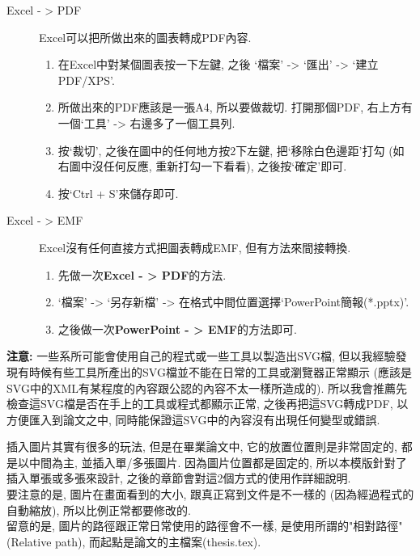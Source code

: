 \begin{description}
  \item[Excel - > PDF] Excel可以把所做出來的圖表轉成PDF內容. 
    \begin{enumerate}
      \item 在Excel中對某個圖表按一下左鍵, 之後 `檔案' -> `匯出' -> `建立PDF/XPS'.
      \item 所做出來的PDF應該是一張A4, 所以要做裁切. 打開那個PDF, 右上方有一個`工具' -> 右邊多了一個工具列.
      \item 按`裁切', 之後在圖中的任何地方按2下左鍵, 把`移除白色邊距'打勾 (如右圖中沒任何反應, 重新打勾一下看看), 之後按`確定'即可.
      \item 按`Ctrl + S'來儲存即可.
    \end{enumerate}

  \item[Excel - > EMF] Excel沒有任何直接方式把圖表轉成EMF, 但有方法來間接轉換.
    \begin{enumerate}
      \item 先做一次\textbf{Excel - > PDF}的方法.
      \item `檔案' -> `另存新檔' -> 在格式中間位置選擇`PowerPoint簡報(*.pptx)'.
      \item 之後做一次\textbf{PowerPoint - > EMF}的方法即可.
    \end{enumerate}
\end{description}

\noindent \textbf{注意:} 一些系所可能會使用自己的程式或一些工具以製造出SVG檔, 但以我經驗發現有時候有些工具所產出的SVG檔並不能在日常的工具或瀏覽器正常顯示 (應該是SVG中的XML有某程度的內容跟公認的內容不太一樣所造成的). 所以我會推薦先檢查這SVG檔是否在手上的工具或程式都顯示正常, 之後再把這SVG轉成PDF, 以方便匯入到論文之中, 同時能保證這SVG中的內容沒有出現任何變型或錯誤.

\newpage
{}

插入圖片其實有很多的玩法, 但是在畢業論文中, 它的放置位置則是非常固定的, 都是以中間為主, 並插入單/多張圖片. 因為圖片位置都是固定的, 所以本模版針對了插入單張或多張來設計, 之後的章節會對這2個方式的使用作詳細說明.\\

要注意的是, 圖片在畫面看到的大小, 跟真正寫到文件是不一樣的 (因為經過程式的自動縮放), 所以比例正常都要修改的.\\

留意的是, 圖片的路徑跟正常日常使用的路徑會不一樣, 是使用所謂的"相對路徑" (Relative path), 而起點是論文的主檔案(thesis.tex).\\

